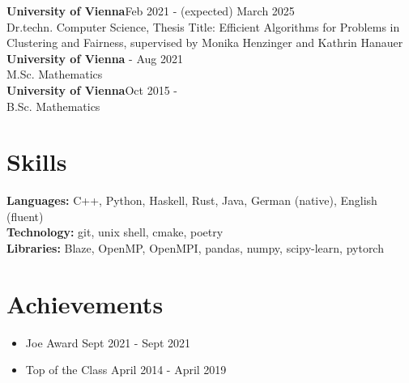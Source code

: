 \documentclass[letterpaper, 10pt]{article}
\newcommand{\secStartSpace}{\vspace{3pt}}
\newcommand{\secEndSpace}{\vspace{5pt}}
\begin{document}
\begin{addmargin}[0.5em]{1em}
	\large\textbf{University of Vienna}\hfill \normalsize{Feb 2021 - (expected) March 2025}\\
	\setlength\parindent{1cm} Dr.techn. Computer Science, Thesis Title: Efficient Algorithms for Problems in Clustering and Fairness, supervised by Monika Henzinger and Kathrin Hanauer\\
	\large\textbf{University of Vienna}\hfill \normalsize{ - Aug 2021}\\
	\setlength\parindent{1cm} M.Sc. Mathematics\\
	\large\textbf{University of Vienna}\hfill \normalsize{Oct 2015 - }\\
	\setlength\parindent{1cm} B.Sc. Mathematics\\
\end{addmargin}
\secEndSpace
\secEndSpace


\section{\color{blue} \textbf{Skills}}
\secStartSpace

\begin{addmargin}[0.5em]{1em}
	\noindent \textbf{Languages:} C++, Python, Haskell, Rust, Java, German (native), English (fluent) \\
	\noindent \textbf{Technology:} git, unix shell, cmake, poetry \\
	\noindent \textbf{Libraries:} Blaze, OpenMP, OpenMPI, pandas, numpy, scipy-learn, pytorch \\
\end{addmargin}
\secEndSpace
\secEndSpace


\section{\color{blue} \textbf{Achievements}}
\secStartSpace

\hypersetup{
    colorlinks=true,
    linkcolor=HeaderColor,
    filecolor=HeaderColor,
    urlcolor=HeaderColor,
}

\begin{addmargin}[0.5em]{1em}
    \begin{itemize}[itemsep=-2.25pt, leftmargin=1.5em]
        \item Joe Award \hfill Sept 2021 - Sept 2021
        \item Top of the Class \hfill April 2014 - April 2019
    \end{itemize}
\end{addmargin}
\end{document}
